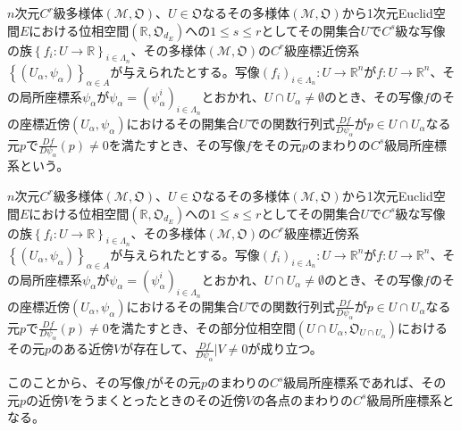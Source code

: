 \documentclass[dvipdfmx]{jsarticle}
\begin{document}
\begin{dfn}
$n$次元$C^{r}$級多様体$\left( \mathcal{M},\mathfrak{O} \right)$、$U \in \mathfrak{O}$なるその多様体$\left( \mathcal{M},\mathfrak{O} \right)$から1次元Euclid空間$E$における位相空間$\left( \mathbb{R},\mathfrak{O}_{d_{E}} \right)$への$1\leq s \leq r$としてその開集合$U$で$C^{s}$級な写像の族$\left\{ f_i :U \rightarrow \mathbb{R} \right\}_{i\in \varLambda_n } $、その多様体$\left( \mathcal{M},\mathfrak{O} \right)$の$C^{r}$級座標近傍系$\left\{ \left( U_{\alpha},\psi_{\alpha} \right) \right\}_{\alpha \in A}$が与えられたとする。写像$\left( f_i \right)_{i\in \varLambda_n } :U \rightarrow \mathbb{R}^n $が$f:U \rightarrow \mathbb{R}^n $、その局所座標系$\psi_\alpha $が$\psi_\alpha =\left( \psi_\alpha^i \right)_{i\in \varLambda_n }$とおかれ、$U\cap U_\alpha \ne \emptyset $のとき、その写像$f$のその座標近傍$\left(U_\alpha ,\psi_\alpha \right)$におけるその開集合$U$での関数行列式$\frac{Df}{D\psi_\alpha }$が$p\in U\cap U_\alpha $なる元$p$で$\frac{Df}{D\psi_\alpha } (p) \ne 0$を満たすとき、その写像$f$をその元$p$のまわりの$C^s $級局所座標系という。
\end{dfn}
\begin{thm}\label{8.3.2.7}
$n$次元$C^{r}$級多様体$\left( \mathcal{M},\mathfrak{O} \right)$、$U \in \mathfrak{O}$なるその多様体$\left( \mathcal{M},\mathfrak{O} \right)$から1次元Euclid空間$E$における位相空間$\left( \mathbb{R},\mathfrak{O}_{d_{E}} \right)$への$1\leq s \leq r$としてその開集合$U$で$C^{s}$級な写像の族$\left\{ f_i :U \rightarrow \mathbb{R} \right\}_{i\in \varLambda_n } $、その多様体$\left( \mathcal{M},\mathfrak{O} \right)$の$C^{r}$級座標近傍系$\left\{ \left( U_{\alpha},\psi_{\alpha} \right) \right\}_{\alpha \in A}$が与えられたとする。写像$\left( f_i \right)_{i\in \varLambda_n } :U \rightarrow \mathbb{R}^n $が$f:U \rightarrow \mathbb{R}^n $、その局所座標系$\psi_\alpha $が$\psi_\alpha =\left( \psi_\alpha^i \right)_{i\in \varLambda_n }$とおかれ、$U\cap U_\alpha \ne \emptyset $のとき、その写像$f$のその座標近傍$\left(U_\alpha ,\psi_\alpha \right)$におけるその開集合$U$での関数行列式$\frac{Df}{D\psi_\alpha }$が$p\in U\cap U_\alpha $なる元$p$で$\frac{Df}{D\psi_\alpha } (p) \ne 0$を満たすとき、その部分位相空間$\left( U\cap U_\alpha ,\mathfrak{O}_{U\cap U_\alpha } \right)$におけるその元$p$のある近傍$V$が存在して、$\frac{Df}{D\psi_\alpha } |V \ne 0$が成り立つ。
\end{thm}\par
このことから、その写像$f$がその元$p$のまわりの$C^s $級局所座標系であれば、その元$p$の近傍$V$をうまくとったときのその近傍$V$の各点のまわりの$C^s $級局所座標系となる。
\end{document}
